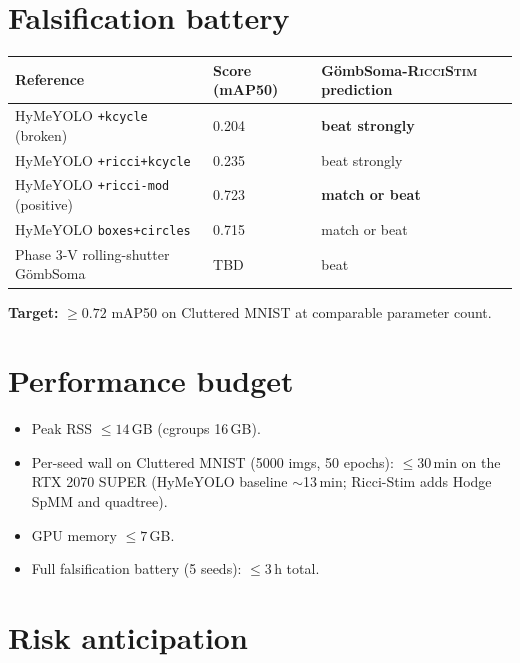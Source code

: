 \documentclass[11pt,a4paper]{article}
\newcommand{\Soma}{G\"ombSoma}
\newcommand{\RicciStim}{\Soma\textsc{-RicciStim}}
\begin{document}
\section{Falsification battery}

\begin{center}
\begin{tabular}{lll}
\toprule
Reference                                & Score (mAP50)  & \RicciStim{} prediction \\
\midrule
HyMeYOLO \texttt{+kcycle} (broken)       & 0.204          & \textbf{beat strongly} \\
HyMeYOLO \texttt{+ricci+kcycle}          & 0.235          & beat strongly \\
HyMeYOLO \texttt{+ricci-mod} (positive)  & 0.723          & \textbf{match or beat} \\
HyMeYOLO \texttt{boxes+circles}          & 0.715          & match or beat \\
Phase 3-V rolling-shutter \Soma           & TBD            & beat \\
\bottomrule
\end{tabular}
\end{center}

\textbf{Target:} $\geq 0.72$ mAP50 on Cluttered MNIST at comparable parameter count.

\section{Performance budget}

\begin{itemize}
\item Peak RSS $\leq 14$\,GB (cgroups 16\,GB).
\item Per-seed wall on Cluttered MNIST (5000 imgs, 50 epochs):
  $\leq 30$\,min on the RTX 2070 SUPER (HyMeYOLO baseline $\sim$13\,min;
  Ricci-Stim adds Hodge SpMM and quadtree).
\item GPU memory $\leq 7$\,GB.
\item Full falsification battery (5 seeds): $\leq 3$\,h total.
\end{itemize}

\section{Risk anticipation}
\end{document}
